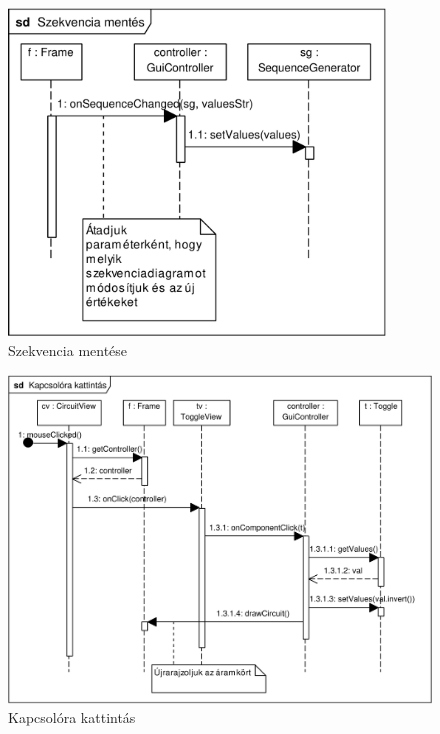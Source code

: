\begin{figure}[h]
\begin{center}
\includegraphics[width=10cm]{chapters/chapter11/pdfs/8_newsequence.pdf}
\caption{Szekvencia mentése}
\label{fig:newsequence}
\end{center}
\end{figure}

\begin{figure}[h]
\begin{center}
\includegraphics[width=17cm]{chapters/chapter11/pdfs/9_toggle.pdf}
\caption{Kapcsolóra kattintás}
\label{fig:toggle}
\end{center}
\end{figure}

